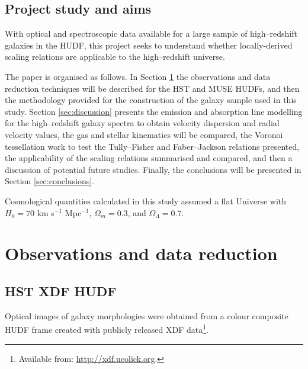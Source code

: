 \documentclass[12pt, twocolumn, nofootinbib]{revtex4-1}    %
\begin{document}
\vspace{2ex} %
\subsection{Project study and aims}
\noindent
With optical and spectroscopic data available for a large sample of high--redshift galaxies in the HUDF, this project seeks to understand whether locally-derived scaling relations are applicable to the high--redshift universe.

The paper is organised as follows. In Section \ref{sec:observations} the observations and data reduction techniques will be described for the HST and MUSE HUDFs, and then the methodology provided for the construction of the galaxy sample used in this study. Section \ref{sec:discussion} presents the emission and absorption line modelling for the high--redshift galaxy spectra to obtain velocity dispersion and radial velocity values, the gas and stellar kinematics will be compared, the Voronoi tessellation work to test the Tully--Fisher and Faber--Jackson relations presented, the applicability of the scaling relations summarised and compared, and then a discussion of potential future studies. Finally, the conclusions will be presented in Section \ref{sec:conclusions}.

Cosmological quantities calculated in this study assumed a flat Universe with $H_0=70$ km s$^{-1}$ Mpc$^{-1}$, $\Omega_m=0.3$, and $\Omega_\Lambda=0.7$.

\vspace{2ex} %
\section{Observations and data reduction} \label{sec:observations}
\subsection{HST XDF HUDF} \label{sec:obs_hst}
\noindent
Optical images of galaxy morphologies were obtained from a colour composite HUDF frame created with publicly released XDF data\footnote{Available from: \href{http://xdf.ucolick.org}{http://xdf.ucolick.org}.}. 
\end{document}
